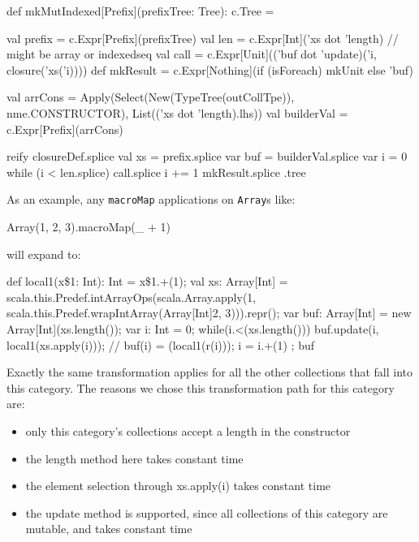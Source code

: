 \begin{scalaCode}
def mkMutIndexed[Prefix](prefixTree: Tree): c.Tree = {
  val prefix   = c.Expr[Prefix](prefixTree)
  val len      = c.Expr[Int]('xs dot 'length) // might be array or indexedseq
  val call     = c.Expr[Unit](('buf dot 'update)('i, closure('xs('i))))
  def mkResult = c.Expr[Nothing](if (isForeach) mkUnit else 'buf)

  val arrCons  =   Apply(Select(New(TypeTree(outCollTpe)), nme.CONSTRUCTOR), List(('xs dot 'length).lhs))
  val builderVal = c.Expr[Prefix](arrCons)
  
  reify {
    closureDef.splice
    val xs = prefix.splice
    var buf = builderVal.splice
    var i  = 0
    while (i < len.splice) {
      call.splice
      i += 1
    }
    mkResult.splice
  }.tree
}
\end{scalaCode}


As an example, any \texttt{macroMap} applications on \texttt{Array}s like:

\begin{scalaCode}
Array(1, 2, 3).macroMap(\_ + 1)
\end{scalaCode}

will expand to:

\begin{scalaCode}
{
  def local1(x\$1: Int): Int = x\$1.+(1);
  val xs: Array[Int] = scala.this.Predef.intArrayOps(scala.Array.apply(1,
scala.this.Predef.wrapIntArray(Array[Int]{2, 3}))).repr();
  var buf: Array[Int] = new Array[Int](xs.length());
  var i: Int = 0;
  while(i.<(xs.length())){
    buf.update(i, local1(xs.apply(i))); // buf(i) = (local1(r(i)));
    i = i.+(1)
  };
  buf
}
\end{scalaCode}

Exactly the same transformation applies for all the other collections that fall
into this category. The reasons we chose this transformation path for this
category are:

\begin{itemize}
 \item 
  only this category's collections accept a length in the constructor
 \item
  the length method here takes constant time
 \item
  the element selection through xs.apply(i) takes constant time
 \item
  the update method is supported, since all collections of this category are
mutable, and takes constant time
\end{itemize}

